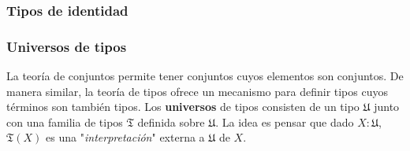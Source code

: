 \documentclass{article}
\begin{document}
    \subsubsection{Tipos de identidad}

    \subsubsection{Universos de tipos}
        La teoría de conjuntos permite tener conjuntos cuyos elementos son 
        conjuntos. De manera similar, la teoría de tipos ofrece un mecanismo
        para definir tipos cuyos términos son también tipos. Los 
        \textbf{universos} de tipos consisten de un tipo $\mathfrak{U}$ junto
        con una familia de tipos $\mathfrak{T}$ definida sobre $\mathfrak{U}$.
        La idea es pensar que dado $X : \mathfrak{U}$, $\mathfrak{T}(X)$ es
        una "\textit{interpretación}" externa a $\mathfrak{U}$ de $X$.
\end{document}
